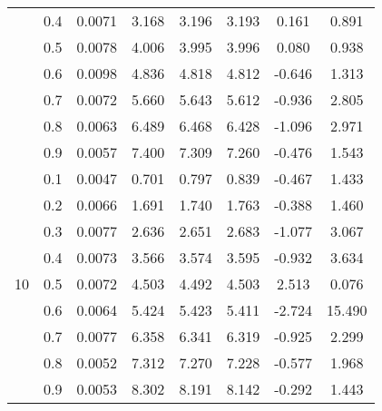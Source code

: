 \documentclass[11pt,a4paper]{report}
\begin{document}
\begin{longtable}{ | c | c || c | c | c | c | c | c | }
 & 0.4 & 0.0071 & 3.168 & 3.196 & 3.193 & 0.161 & 0.891 \\
 & 0.5 & 0.0078 & 4.006 & 3.995 & 3.996 & 0.080 & 0.938 \\
 & 0.6 & 0.0098 & 4.836 & 4.818 & 4.812 & -0.646 & 1.313 \\
 & 0.7 & 0.0072 & 5.660 & 5.643 & 5.612 & -0.936 & 2.805 \\
 & 0.8 & 0.0063 & 6.489 & 6.468 & 6.428 & -1.096 & 2.971 \\
 & 0.9 & 0.0057 & 7.400 & 7.309 & 7.260 & -0.476 & 1.543 \\
 \hline
\multirow{9}{*}{10} & 0.1 & 0.0047 & 0.701 & 0.797 & 0.839 & -0.467 & 1.433 \\
 & 0.2 & 0.0066 & 1.691 & 1.740 & 1.763 & -0.388 & 1.460 \\
 & 0.3 & 0.0077 & 2.636 & 2.651 & 2.683 & -1.077 & 3.067 \\
 & 0.4 & 0.0073 & 3.566 & 3.574 & 3.595 & -0.932 & 3.634 \\
 & 0.5 & 0.0072 & 4.503 & 4.492 & 4.503 & 2.513 & 0.076 \\
 & 0.6 & 0.0064 & 5.424 & 5.423 & 5.411 & -2.724 & 15.490 \\
 & 0.7 & 0.0077 & 6.358 & 6.341 & 6.319 & -0.925 & 2.299 \\
 & 0.8 & 0.0052 & 7.312 & 7.270 & 7.228 & -0.577 & 1.968 \\
 & 0.9 & 0.0053 & 8.302 & 8.191 & 8.142 & -0.292 & 1.443 \\
 \hline
\hline
\end{longtable}
\end{document}
